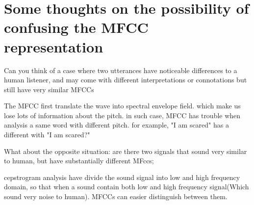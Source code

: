 \documentclass{article}
\begin{document}
    \section{Some thoughts on the possibility of confusing the MFCC representation}
    Can you think of a case where two utterances have noticeable differences to a human
    listener, and may come with different interpretations or connotations but still have very similar MFCCs\\
    \begin{adjustwidth}{2em}{0pt}
        The MFCC first translate the wave into spectral envelope field. which make us lose lots of
        information about the pitch. in such case, MFCC has trouble when analysis a same word with
        different pitch. for example, "I am scared" has a different with "I am scared?"
    \end{adjustwidth}
    What about the opposite situation: are there two signals that sound very similar to human, but have substantially
    different MFccs;
    \begin{adjustwidth}{2em}{0pt}
        cepstrogram analysis have divide the sound signal into
        low and high frequency domain, so that when a sound contain both low
        and high frequency signal(Which sound very noise to human). MFCCs can
        easier distinguish between them.
    \end{adjustwidth}
    
    
\end{document}
